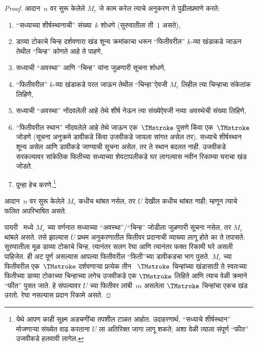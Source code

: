 \documentclass[../../../include/open-logic-section]{subfiles}
\begin{document}
\begin{proof}
  आदान~$n$ वर सुरू केलेले $M_e$ जे काम
  करेल त्याचे अनुकरण ते पुढीलप्रमाणे करते:
  \begin{enumerate}
    \item “सध्याच्या शीर्षस्थानाची” संख्या~$k$ शोधणे
    (सुरुवातीला ती~$1$ असते),
    \item डाव्या टोकाचे चिन्ह दर्शवणारा खंड शून्य क्रमांकाचा धरून
    “फितीवरील” $k$-व्या खंडाकडे जाऊन
    तेथील “चिन्ह” कोणते आहे ते पाहणे,
    \item{}%
    सध्याची “अवस्था” आणि “चिन्ह” यांना जुळणारी
    सूचना शोधणे,
    \item “फितीवरील” $k$-व्या खंडाकडे
    परत जाऊन तेथील “चिन्हा”ऐवजी $M_e$ लिहील
    त्या चिन्हाचा संकेतांक लिहिणे,
    \item सध्याची “अवस्था” नोंदवलेली आहे
    तेथे शीर्ष नेऊन त्या संख्येऐवजी नव्या
    अवस्थेची संख्या लिहिणे,
    \item “फितीवरील स्थान” नोंदवलेले आहे
    तेथे जाऊन एक~$\TMstroke$ पुसणे किंवा
    एक~$\TMstroke$ जोडणे (सूचना अनुक्रमे
    डावीकडे किंवा उजवीकडे जायला सांगत असेल तर). सध्याचे
    शीर्षस्थान शून्य असेल आणि डावीकडे जाण्याची सूचना असेल,
    तर ते स्थान बदलत नाही. उजवीकडे सरकल्यावर सांकेतिक फितीच्या
    सध्याच्या शेवटापलीकडे घर लागल्यास नवीन रिकाम्या घराचा खंड जोडते.
    \item पुन्हा हेच करणे.\footnote{येथे आपण काही सूक्ष्म
    अडचणींचा तपशील टाळत आहोत. उदाहरणार्थ,
    “सध्याचे शीर्षस्थान” मोजणाऱ्या संख्येत
    वाढ करताना $U$ ला अतिरिक्त जागा लागू शकते;
    अशा वेळी त्याला संपूर्ण “फीत” उजवीकडे
    हलवावी लागेल.}
  \end{enumerate}
  आदान~$n$ वर सुरू केलेले $M_e$ कधीच थांबत
  नसेल, तर $U$ देखील कधीच थांबत नाही;
  म्हणून त्याचे फलित अपरिभाषित असते.

  पायरी~ मध्ये $M_e$ च्या
  वर्णनात सध्याच्या “अवस्था”/“चिन्ह” जोडीला
  जुळणारी सूचना नसेल, तर $M_e$ थांबले असते.
  तसे झाल्यास $U$ प्रथम अनुकरणातील फितीवर प्रदानाची व्याख्या
  लागू होते का ते तपासते: सुरुवातीला मूळ डाव्या टोकाचे चिन्ह,
  त्यानंतर सलग रेघा आणि त्यानंतर फक्त रिकामी घरे असली पाहिजेत.
  ही अट पूर्ण असल्यास आपल्या फितीवरील “फिती”च्या
  डावीकडचा भाग पुसते. $M_e$ च्या फितीवरील
  एक~$\TMstroke$ दर्शवणाऱ्या प्रत्येक तीन
  ~$\TMstroke$ चिन्हांच्या खंडासाठी ते
  स्वतःच्या फितीच्या डाव्या टोकाच्या चिन्हाच्या लगेच उजवीकडे एक
  $\TMstroke$ लिहिते आणि त्याच वेळी क्रमाने
  “फीत” पुसत जाते. हे संपल्यावर $U$ च्या
  फितीवर लांबी~$m$ असलेला $\TMstroke$
  चिन्हांचा एकच खंड उरतो. रेघा नसल्यास प्रदान रिकामे असते.


\end{proof}
\end{document}
